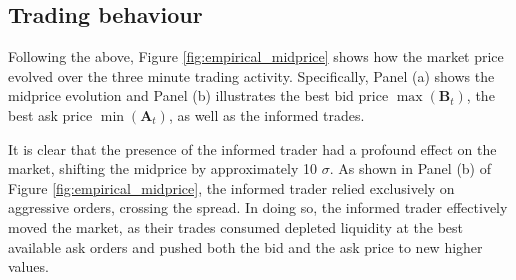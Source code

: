 \subsection{Trading behaviour}
Following the above, Figure \ref{fig:empirical_midprice} shows how the market price evolved over the three minute trading activity. Specifically, Panel (a) shows the midprice evolution and Panel (b) illustrates the best bid price $\max(\mathbf{B}_t)$, the best ask price $\min(\mathbf{A}_t)$, as well as the informed trades. 

It is clear that the presence of the informed trader had a profound effect on the market, shifting the midprice by approximately 10 $\sigma$. As shown in Panel (b) of Figure \ref{fig:empirical_midprice}, the informed trader relied exclusively on aggressive orders, crossing the spread. In doing so, the informed trader effectively moved the market, as their trades consumed depleted liquidity at the best available ask orders and pushed both the bid and the ask price to new higher values. 

